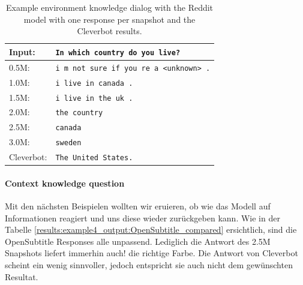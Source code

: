 \begin{table}[H]
	\centering
	\begin{adjustbox}{max width=\textwidth}
		\begin{tabular}{ll}
			\toprule
			Input: 	& \texttt{In which country do you live?}\\
			\midrule
			0.5M: 	& \texttt{i m not sure if you re a <unknown> .}\\
			1.0M: 	& \texttt{i live in canada .}\\
			1.5M:	& \texttt{i live in the uk .}\\
			2.0M:	& \texttt{the country}\\
			2.5M:	& \texttt{canada}\\
			3.0M:	& \texttt{sweden}\\
			Cleverbot:&\texttt{The United States.}\\
			\bottomrule
		\end{tabular}
	\end{adjustbox}
	\caption{Example environment knowledge dialog with the Reddit model with one response per snapshot and the Cleverbot results.}
	\label{results:example3_output:Reddit_compared}
\end{table}

\paragraph{Context knowledge question}Mit den nächsten Beispielen wollten wir eruieren, ob wie das Modell auf Informationen reagiert und uns diese wieder zurückgeben kann. Wie in der Tabelle \ref{results:example4_output:OpenSubtitle_compared} ersichtlich, sind die OpenSubtitle Responses alle unpassend. Lediglich die Antwort des 2.5M Snapshots liefert immerhin auch! die richtige Farbe. Die Antwort von Cleverbot scheint ein wenig sinnvoller, jedoch entspricht sie auch nicht dem gewünschten Resultat.

